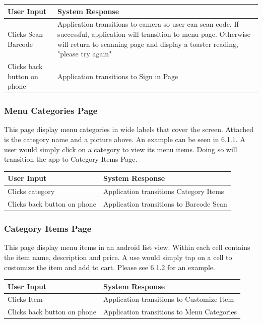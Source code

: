 \documentclass[12pt, titlepage]{article}
\begin{document}
\begin{center}
    \begin{tabular}{ | l | p{10cm} |}
    \hline
    User Input & System Response \\ \hline
    Clicks Scan Barcode & Application transitions to camera so user can scan code. If successful, application will transition to menu page. Otherwise will return to scanning page and display a toaster reading, "please try again" \\ \hline
    Clicks back button on phone & Application transitions to Sign in Page \\
    \hline
    \end{tabular}
\end{center}

\subsubsection{Menu Categories Page}
This page display menu categories in wide labels that cover the screen. Attached is the category name and a picture above. An example can be seen in 6.1.1. A user would simply click on a category to view its menu items. Doing so will transition the app to Category Items Page. 

\begin{center}
    \begin{tabular}{ | l | p{10cm} |}
    \hline
    User Input & System Response \\ \hline
    Clicks category & Application transitions Category Items \\ \hline
    Clicks back button on phone & Application transitions to Barcode Scan \\
    \hline
    \end{tabular}
\end{center}

\subsubsection{Category Items Page}
This page display menu items in an android list view. Within each cell contains the item name, description and price. A use would simply tap on a cell to customize the item and add to cart. Please see 6.1.2 for an example.

\begin{center}
    \begin{tabular}{ | l | p{10cm} |}
    \hline
    User Input & System Response \\ \hline
    Clicks Item & Application transitions to Customize Item \\ \hline
    Clicks back button on phone & Application transitions to Menu Categories \\
    \hline
    \end{tabular}
\end{center}
\end{document}
